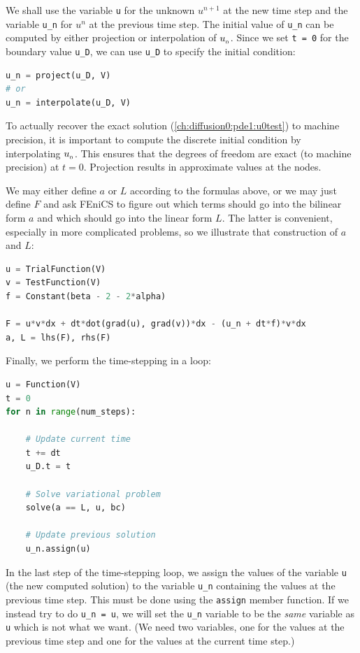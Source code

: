 \documentclass[graybox,envcountchap,sectrefs,final]{svmonodo}
\newenvironment{warning_mdfboxadmon}[1][]{
\begin{warning_mdfboxmdframed}[frametitle=#1]
}
{
\end{warning_mdfboxmdframed}
}
\begin{document}
We shall use the variable \texttt{u} for the unknown $u^{n+1}$ at the new
time step and the variable \Verb!u_n! for $u^n$ at the previous time
step. The initial value of \Verb!u_n! can be computed by either projection
or interpolation of $\uI$. Since we set \texttt{t = 0} for the boundary value
\Verb!u_D!, we can use \Verb!u_D! to specify the initial condition:

\begin{lstlisting}[language=Python,style=graycolor]
u_n = project(u_D, V)
# or
u_n = interpolate(u_D, V)
\end{lstlisting}

\begin{warning_mdfboxadmon}
To actually recover the exact solution
(\ref{ch:diffusion0:pde1:u0test}) to machine precision, it is important
to compute the discrete initial condition by interpolating $\uI$. This
ensures that the degrees of freedom are exact (to machine precision)
at $t=0$. Projection results in approximate values at the nodes.
\end{warning_mdfboxadmon} %


We may either define $a$ or $L$ according to the formulas above, or we
may just define $F$ and ask FEniCS to figure out which terms should go
into the bilinear form $a$ and which should go into the linear form
$L$. The latter is convenient, especially in more complicated
problems, so we illustrate that construction of $a$ and $L$:

\begin{lstlisting}[language=Python,style=graycolor]
u = TrialFunction(V)
v = TestFunction(V)
f = Constant(beta - 2 - 2*alpha)

F = u*v*dx + dt*dot(grad(u), grad(v))*dx - (u_n + dt*f)*v*dx
a, L = lhs(F), rhs(F)
\end{lstlisting}

Finally, we perform the time-stepping in a loop:

\begin{lstlisting}[language=Python,style=graycolor]
u = Function(V)
t = 0
for n in range(num_steps):

    # Update current time
    t += dt
    u_D.t = t

    # Solve variational problem
    solve(a == L, u, bc)

    # Update previous solution
    u_n.assign(u)
\end{lstlisting}
In the last step of the time-stepping loop, we assign the values of
the variable \texttt{u} (the new computed solution) to the variable \Verb!u_n!
containing the values at the previous time step. This must be done
using the \texttt{assign} member function. If we instead try to do \Verb!u_n = u!,
we will set the \Verb!u_n! variable to be the \emph{same} variable as \texttt{u}
which is not what we want. (We need two variables, one for the values
at the previous time step and one for the values at the current time
step.)
\end{document}

